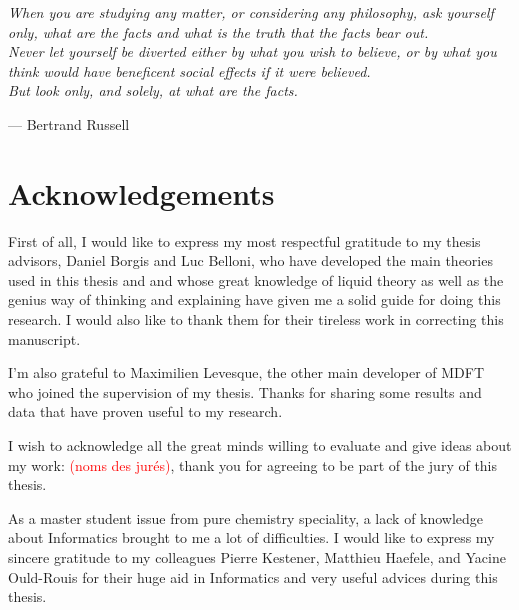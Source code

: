 
\begin{flushright}
\textsl{When you are studying any matter, or considering any philosophy,
ask yourself only, what are the facts and what is the truth that the
facts bear out.}\\
\textsl{ Never let yourself be diverted either by what you wish to
believe, or by what you think would have beneficent social effects
if it were believed.}\\
\textsl{ But look only, and solely, at what are the facts.}
\par\end{flushright}

\begin{flushright}
— Bertrand Russell 
\par\end{flushright}

\bigskip{}

\begingroup
\let\clearpage\relax
\let\cleardoublepage\relax 

\chapter*{Acknowledgements}

First of all, I would like to express my most respectful gratitude
to my thesis advisors, Daniel Borgis and Luc Belloni, who have developed
the main theories used in this thesis and and whose great knowledge
of liquid theory as well as the genius way of thinking and explaining
have given me a solid guide for doing this research. I would also
like to thank them for their tireless work in correcting this manuscript.

I'm also grateful to Maximilien Levesque, the other main developer
of MDFT who joined the supervision of my thesis. Thanks for sharing
some results and data that have proven useful to my research.

I wish to acknowledge all the great minds willing to evaluate and
give ideas about my work: \textcolor{red}{(noms des jurés)}, thank
you for agreeing to be part of the jury of this thesis.

As a master student issue from pure chemistry speciality, a lack of
knowledge about Informatics brought to me a lot of difficulties. I
would like to express my sincere gratitude to my colleagues Pierre
Kestener, Matthieu Haefele, and Yacine Ould-Rouis for their huge aid
in Informatics and very useful advices during this thesis.

